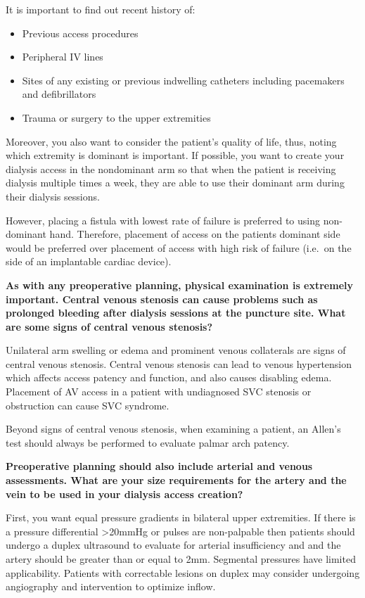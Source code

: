 \documentclass[
]{book}
\begin{document}
It is important to find out recent history of:

\begin{itemize}
\item
  Previous access procedures
\item
  Peripheral IV lines
\item
  Sites of any existing or previous indwelling catheters including
  pacemakers and defibrillators
\item
  Trauma or surgery to the upper extremities
\end{itemize}

Moreover, you also want to consider the patient's quality of life, thus,
noting which extremity is dominant is important. If possible, you want
to create your dialysis access in the nondominant arm so that when the
patient is receiving dialysis multiple times a week, they are able to
use their dominant arm during their dialysis sessions.

However, placing a fistula with lowest rate of failure is preferred to
using non-dominant hand. Therefore, placement of access on the patients
dominant side would be preferred over placement of access with high risk
of failure (i.e.~on the side of an implantable cardiac
device).\citep{sgroi2019}

\textbf{As with any preoperative planning, physical examination is extremely
important. Central venous stenosis can cause problems such as prolonged
bleeding after dialysis sessions at the puncture site. What are some
signs of central venous stenosis?}

Unilateral arm swelling or edema and prominent venous collaterals are
signs of central venous stenosis. Central venous stenosis can lead to
venous hypertension which affects access patency and function, and also
causes disabling edema. Placement of AV access in a patient with
undiagnosed SVC stenosis or obstruction can cause SVC
syndrome.\citep{kalra2019}

Beyond signs of central venous stenosis, when examining a patient, an
Allen's test should always be performed to evaluate palmar arch patency.

\textbf{Preoperative planning should also include arterial and venous
assessments. What are your size requirements for the artery and the vein
to be used in your dialysis access creation?}

First, you want equal pressure gradients in bilateral upper extremities.
If there is a pressure differential \textgreater20mmHg or pulses are non-palpable
then patients should undergo a duplex ultrasound to evaluate for
arterial insufficiency and and the artery should be greater than or
equal to 2mm. Segmental pressures have limited applicability. Patients
with correctable lesions on duplex may consider undergoing angiography
and intervention to optimize inflow.\citep{sidawy2008}
\end{document}
